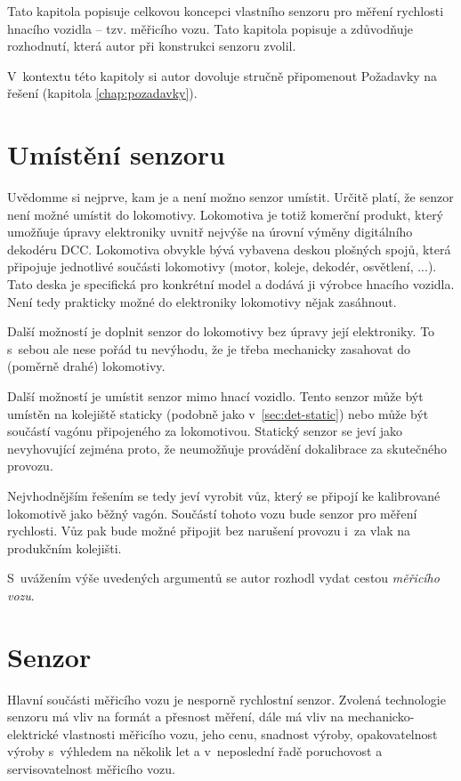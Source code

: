 Tato kapitola popisuje celkovou koncepci vlastního senzoru pro měření
rychlosti hnacího vozidla -- tzv. měřicího vozu. Tato kapitola popisuje
a zdůvodňuje rozhodnutí, která autor při konstrukci senzoru zvolil.

V~kontextu této kapitoly si autor dovoluje stručně připomenout Požadavky
na řešení (kapitola \ref{chap:pozadavky}).

\section{Umístění senzoru}
\label{sec:wsm-senzor-umisteni}

Uvědomme si nejprve, kam je a není možno senzor umístit. Určitě platí, že
senzor není možné umístit do lokomotivy. Lokomotiva je totiž komerční produkt,
který umožňuje úpravy elektroniky uvnitř nejvýše na úrovní výměny digitálního
dekodéru DCC. Lokomotiva obvykle bývá vybavena deskou plošných spojů, která
připojuje jednotlivé součásti lokomotivy (motor, koleje, dekodér, osvětlení,
...). Tato deska je specifická pro konkrétní model a dodává ji výrobce hnacího
vozidla. Není tedy prakticky možné do elektroniky lokomotivy nějak zasáhnout.

Další možností je doplnit senzor do lokomotivy bez úpravy její elektroniky.
To s~sebou ale nese pořád tu nevýhodu, že je třeba mechanicky zasahovat do
(poměrně drahé) lokomotivy.

Další možností je umístit senzor mimo hnací vozidlo. Tento senzor může být
umístěn na kolejiště staticky (podobně jako v~\ref{sec:det-static}) nebo může
být součástí vagónu připojeného za lokomotivou. Statický senzor se jeví jako
nevyhovující zejména proto, že neumožňuje provádění dokalibrace za skutečného
provozu.

Nejvhodnějším řešením se tedy jeví vyrobit vůz, který se připojí ke kalibrované
lokomotivě jako běžný vagón. Součástí tohoto vozu bude senzor pro měření
rychlosti. Vůz pak bude možné připojit bez narušení provozu i~za vlak na
produkčním kolejišti.

S~uvážením výše uvedených argumentů se autor rozhodl vydat cestou
\textit{měřicího vozu}.

\section{Senzor}
\label{sec:wsm-senzor}

Hlavní součásti měřicího vozu je nesporně rychlostní senzor. Zvolená
technologie senzoru má vliv na formát a přesnost měření, dále má vliv na
mechanicko-elektrické vlastnosti měřicího vozu, jeho cenu, snadnost výroby,
opakovatelnost výroby s~výhledem na několik let a v~neposlední řadě poruchovost
a servisovatelnost měřicího vozu.

